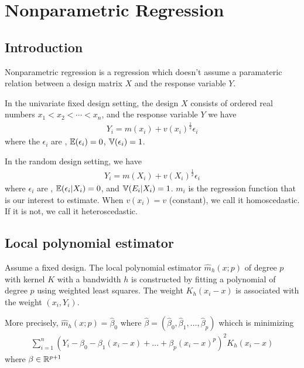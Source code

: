 \chapter{Nonparametric Regression}
\label{cha:nonp-regr}

\section{Introduction}
\label{sec:introduction}

Nonparametric regression is a regression which doesn't assume a
paramateric relation between a design matrix $X$ and the response
variable $Y$.

In the univariate fixed design setting, the design $X$ consists of
ordered real numbers $x_{1} < x_{2} < \cdots < x_{n}$, and the
response variable $Y$ we have
\begin{align}
  \label{eq:50}
  Y_{i} = m(x_{i}) + v(x_{i})^{\frac{1}{2}} \epsilon_{i}
\end{align} where the $\epsilon_{i}$ are \iid, $\E{\epsilon_{i}} = 0$,
$\Var{\epsilon_{i}} = 1$.

In the random design setting, we have
\begin{align}
  \label{eq:51}
  Y_{i} = m(X_{i}) + v(X_{i})^{\frac{1}{2}} \epsilon_{i}
\end{align} where $\epsilon_{i}$ are \iid, $\E{\epsilon_{i} | X_{i}} =
0$, and $\Var{E_{i} | X_{i}} = 1$. $m_{i}$ is the regression function
that is our interest to estimate. When $v(x_{i}) = v$ (constant), we
call it homoscedastic. If it is not, we call it heteroscedastic.

\section{Local polynomial estimator}
\label{sec:local-polyn-estim}

Assume a fixed design.  The local polynomial estimator $\hat m_{h}(x;
p)$ of degree $p$ with kernel $K$ with a bandwidth $h$ is constructed
by fitting a polynomial of degree $p$ using weighted least squares.
The weight $K_{h}(x_{i} - x)$ is associated with the weight $(x_{i},
Y_{i})$.

More precisely, $\hat m_{h}(x; p) = \hat \beta_{0}$ where $\hat \beta =
(\hat \beta_{0}, \hat \beta_{1}, \dots, \hat \beta_{p})$ whicch is
minimizing
\begin{align}
  \label{eq:52}
  \sum_{i=1}^{n} (Y_{i} - \beta_{0} - \beta_{1}(x_{i} - x) + \dots +
  \beta_{p}(x_{i} - x)^{p})^{2} K_{h}(x_{i} - x)
\end{align} where $\beta \in \mathbb{R}^{p+1}$

